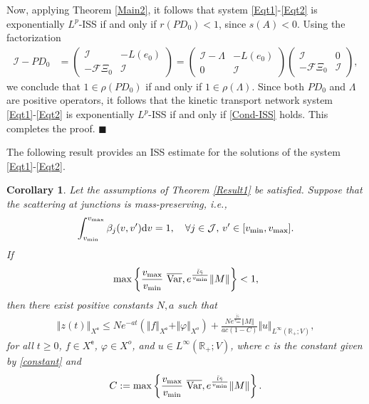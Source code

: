 \documentclass[onecolumn]{autart}
\def\R{{\mathbb{R}}}
\def\calF{{\mathcal{F}}}
\def\R{\mathbb R}
\newtheorem{corollary}{Corollary}[section]
\numberwithin{equation}{section}
\begin{document}
		Now, applying Theorem \ref{Main2}, it follows that system \eqref{Eqt1}-\eqref{Eqt2} is exponentially $L^p$-ISS if and only if $r(PD_0) < 1$, since $s(A) <0$. Using the factorization
		\begin{align}\label{factorization}
			\mathcal{I}-PD_0&=\begin{pmatrix}
				\mathcal{I} & -{L} (e_0)\\
				-\calF \Xi_0 &  \mathcal{I}
			\end{pmatrix}
			=\begin{pmatrix}
				\mathcal{I}-\Lambda & - {L} (e_0)\\
				0& 	\mathcal{I}
			\end{pmatrix}			\begin{pmatrix}
				\mathcal{I} & 0\\
				-\calF\Xi_0  &  \mathcal{I}
			\end{pmatrix},	
		\end{align}
		we conclude that $1 \in \rho(PD_0)$ if and only if $1 \in \rho(\Lambda)$. Since both $PD_0$ and $\Lambda$ are positive operators, it follows that the kinetic transport network system \eqref{Eqt1}-\eqref{Eqt2} is exponentially $L^p$-ISS if and only if \eqref{Cond-ISS} holds. This completes the proof. \hfill $\blacksquare$\par

	
	
	
	The following result  provides an ISS estimate for the solutions of the system \eqref{Eqt1}-\eqref{Eqt2}.
	\begin{corollary}\label{Result2}
		Let the assumptions of Theorem \ref{Result1} be satisfied. Suppose that the scattering at junctions is mass-preserving, i.e.,
		\begin{align}\label{beta}
			\int_{v_{\min}}^{v_{\max}}\beta_j(v,v'){\rm{d}} v=1,\quad \forall j\in \mathcal{J}, \,v'\in [v_{\min},v_{\max}].
		\end{align}
		If
		\begin{align}\label{C1}
			\max\left\{\frac{v_{\max}}{v_{\min}}\ \overline{{\rm Var}} ,e^{\frac{ \bar{l}\bar{\gamma}}{v_{\min}}}\Vert M \Vert\right\}<1,
		\end{align}
		then there exist positive constants $N,a $ such that
		\begin{align}\label{ISS-estimate-trp}
			\left\Vert z(t)\right\Vert_{X^{\mathsf{e}}} \leq  Ne^{-a t}\left(\Vert f\Vert_{X^{\mathsf{e}}}+\Vert\varphi\Vert_{X^o}\right)+\frac{N e^{\frac{ \bar{l}\bar{\gamma}}{v_{\min}}}\Vert M \Vert}{ac(1-C)}\Vert u\Vert_{L^\infty(\R_+;V)},
		\end{align}
		for all $t\ge 0$, $f\in X^{\mathsf{e}}$, $\varphi\in X^{o}$, and $u\in L^\infty(\R_+;V)$, where $c$ is the constant given by \eqref{constant} and
		$$C:=\max\left\{\frac{v_{\max}}{v_{\min}}\ \overline{{\rm Var}},e^{\frac{ \bar{l}\bar{\gamma}}{v_{\min}}}\Vert M \Vert\right\}.$$
	\end{corollary}
	
\end{document}
